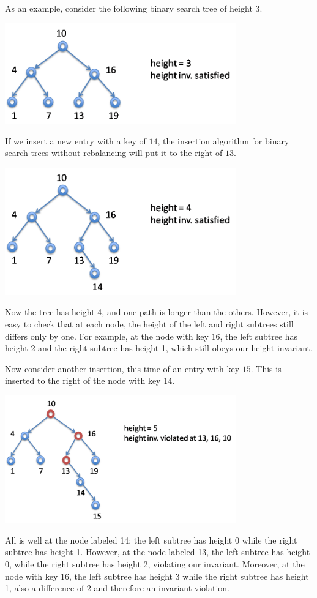 As an example, consider the following binary search tree of height 3.
\begin{center}
  \includegraphics[width=0.75\textwidth]{img/avl1.png}
\end{center}
If we insert a new entry with a key of $14$, the insertion algorithm
for binary search trees without rebalancing will put it to the
right of $13$.
\begin{center}
  \includegraphics[width=0.75\textwidth]{img/avl2.png}
\end{center}
Now the tree has height 4, and one path is longer than the others.
However, it is easy to check that at each node, the height of the
left and right subtrees still differs only by one.  For example,
at the node with key $16$, the left subtree has height 2 and the right
subtree has height 1, which still obeys our height invariant.

Now consider another insertion, this time of an entry with key $15$.
This is inserted to the right of the node with key 14.
\begin{center}
  \includegraphics[width=0.75\textwidth]{img/avl3.png}
\end{center}
All is well at the node labeled 14: the left subtree has height 0
while the right subtree has height 1.  However, at the node labeled
13, the left subtree has height 0, while the right subtree has height
2, violating our invariant.  Moreover, at the node with key 16, the
left subtree has height 3 while the right subtree has height 1, also a
difference of 2 and therefore an invariant violation.

